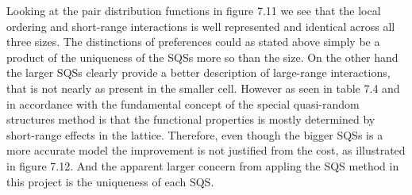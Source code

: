 Looking at the pair distribution functions in figure 7.11 we see that the local ordering and short-range interactions is well represented and identical across all three sizes. The distinctions of preferences could as stated above simply be a product of the uniqueness of the SQSs more so than the size. On the other hand the larger SQSs clearly provide a better description of large-range interactions, that is not nearly as present in the smaller cell. However as seen in table 7.4 and in accordance with the fundamental concept of the special quasi-random structures method is that the functional properties is mostly determined by short-range effects in the lattice. Therefore, even though the bigger SQSs is a more accurate model the improvement is not justified from the cost, as illustrated in figure 7.12. And the apparent larger concern from appling the SQS method in this project is the uniqueness of each SQS.
